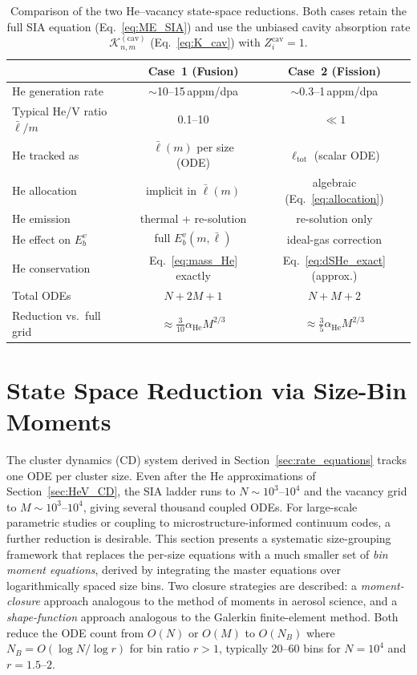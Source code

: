 \documentclass[pdflatex,sn-basic]{sn-jnl} %
\begin{document}
\begin{table}[htbp]
\centering
\caption{Comparison of the two He--vacancy state-space reductions.
Both cases retain the full SIA equation (Eq.~\ref{eq:ME_SIA}) and use
the unbiased cavity absorption rate $\mathcal{K}_{n,m}^{(\mathrm{cav})}$
(Eq.~\ref{eq:K_cav}) with $Z_i^{\mathrm{cav}}=1$.}
\label{tab:HeV_comparison}
\renewcommand{\arraystretch}{1.2}
\begin{tabular}{@{}lcc@{}}
\toprule
& \textbf{Case~1 (Fusion)} & \textbf{Case~2 (Fission)} \\
\midrule
He generation rate & $\sim$10--15\,appm/dpa & $\sim$0.3--1\,appm/dpa \\
Typical He/V ratio $\bar{\ell}/m$ & 0.1--10 & $\ll 1$ \\
He tracked as & $\bar{\ell}(m)$ per size (ODE) & $\ell_{\mathrm{tot}}$ (scalar ODE) \\
He allocation & implicit in $\bar{\ell}(m)$ & algebraic (Eq.~\ref{eq:allocation}) \\
He emission & thermal + re-solution & re-solution only \\
He effect on $E_b^v$ & full $E_b^v(m,\bar{\ell})$ & ideal-gas correction \\
He conservation & Eq.~\ref{eq:mass_He} exactly & Eq.~\ref{eq:dSHe_exact} (approx.) \\
Total ODEs & $N + 2M + 1$ & $N + M + 2$ \\
Reduction vs.\ full grid & $\approx \tfrac{3}{10}\alpha_{\mathrm{He}} M^{2/3}$ & $\approx \tfrac{3}{5}\alpha_{\mathrm{He}} M^{2/3}$ \\
\bottomrule
\end{tabular}
\end{table}
\section{State Space Reduction via Size-Bin Moments}
\label{sec:size_moments}

The cluster dynamics (CD) system derived in
Section~\ref{sec:rate_equations} tracks one ODE per cluster size.
Even after the He approximations of Section~\ref{sec:HeV_CD}, the SIA
ladder runs to $N \sim 10^3$--$10^4$ and the vacancy grid to
$M \sim 10^3$--$10^4$, giving several thousand coupled ODEs. For
large-scale parametric studies or coupling to microstructure-informed
continuum codes, a further reduction is desirable. This section
presents a systematic size-grouping framework that replaces the
per-size equations with a much smaller set of \emph{bin moment
equations}, derived by integrating the master equations over
logarithmically spaced size bins. Two closure strategies are described:
a \emph{moment-closure} approach analogous to the method of moments in
aerosol science, and a \emph{shape-function} approach analogous to the
Galerkin finite-element method. Both reduce the ODE count from
$O(N)$ or $O(M)$ to $O(N_B)$ where
$N_B = O(\log N / \log r)$ for bin ratio $r > 1$, typically 20--60
bins for $N = 10^4$ and $r = 1.5$--$2$.
\end{document}

